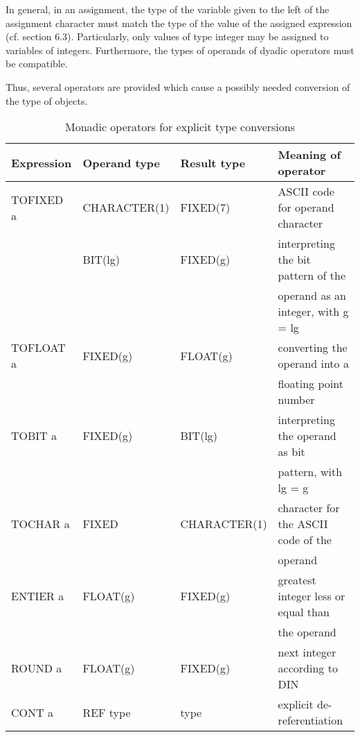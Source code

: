 In general, in an assignment, the type of the variable given to the left
of the assignment character must match the type of the value of the
assigned expression (cf. section 6.3). Particularly, only values of type
integer may be assigned to variables of integers. Furthermore, the types
of operands of dyadic operators must be compatible.

Thus, several operators are provided which cause a possibly needed
conversion of the type of objects.

\begin{table} %
\begin{center}
\caption{Monadic operators for explicit type conversions}
\label{tab72}
\vspace{5mm}
\begin{tabular}{|l|l|l|l|}
\hline
{\bf Expression} & {\bf Operand type} & {\bf Result type} & {\bf Meaning of operator}\\ \hline

TOFIXED a        & CHARACTER(1)      & FIXED(7)         & ASCII code for operand character\\ \cline{2-4}
                     
                 & BIT(lg)           & FIXED(g)         & interpreting the bit pattern of the\\
                 &                   &                  & operand as an integer, with g = lg\\ \hline

TOFLOAT a        & FIXED(g)          & FLOAT(g)         & converting the operand into a\\
                 &                   &                  & floating point number\\ \hline
    
TOBIT a          & FIXED(g)          & BIT(lg)          & interpreting the operand as bit\\
                 &                   &                  & pattern, with lg = g\\ \hline

TOCHAR a         & FIXED             & CHARACTER(1)     & character for the ASCII code of the\\
                 &                   &                  & operand\\ \hline

ENTIER a         & FLOAT(g)          & FIXED(g)         & greatest integer less or equal than\\
                 &                   &                  & the operand\\ \hline
 
ROUND a          & FLOAT(g)          & FIXED(g)         & next integer according to DIN\\ \hline

CONT a           & REF type          & type             & explicit de-referentiation\\
\hline
\end{tabular}  
\end{center} 
\end{table}

